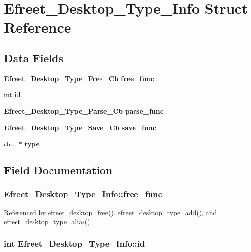 \section{Efreet\_\-Desktop\_\-Type\_\-Info Struct Reference}
\label{structEfreet__Desktop__Type__Info}
\subsection*{Data Fields}
\begin{CompactItemize}
\item 
{\bf Efreet\_\-Desktop\_\-Type\_\-Free\_\-Cb} {\bf free\_\-func}
\item 
int {\bf id}
\item 
{\bf Efreet\_\-Desktop\_\-Type\_\-Parse\_\-Cb} {\bf parse\_\-func}
\item 
{\bf Efreet\_\-Desktop\_\-Type\_\-Save\_\-Cb} {\bf save\_\-func}
\item 
char $\ast$ {\bf type}
\end{CompactItemize}


\subsection{Field Documentation}
\subsubsection[free\_\-func]{ {\bf Efreet\_\-Desktop\_\-Type\_\-Info::free\_\-func}}\label{structEfreet__Desktop__Type__Info_1426b2c43ca58b98490b577e481f5af9}




Referenced by efreet\_\-desktop\_\-free(), efreet\_\-desktop\_\-type\_\-add(), and efreet\_\-desktop\_\-type\_\-alias().
\subsubsection[id]{\setlength{\rightskip}{0pt plus 5cm}int {\bf Efreet\_\-Desktop\_\-Type\_\-Info::id}}\label{structEfreet__Desktop__Type__Info_cab73ad804a54b8f85030cf356c1c047}




